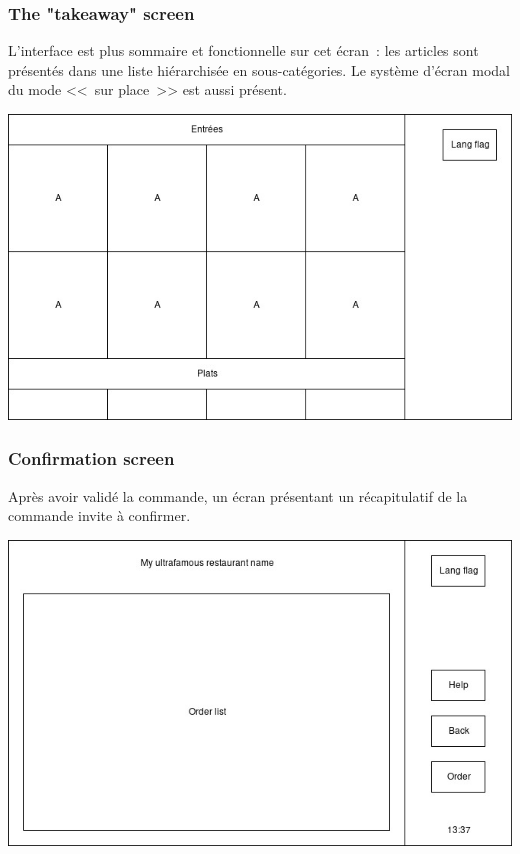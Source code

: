 \documentclass[a4paper,12pt]{article}
\begin{document}
\subsubsection{The "takeaway" screen}

L'interface est plus sommaire et fonctionnelle sur cet écran~: les articles sont présentés dans une liste hiérarchisée
en sous-catégories. Le système d'écran modal du mode <<~sur place~>> est aussi présent.

\begin{center}
	\includegraphics[width=\textwidth]{takeaway_screen.jpg}
\end{center}

\subsubsection{Confirmation screen}
Après avoir validé la commande, un écran présentant un récapitulatif de la commande invite à confirmer.

\begin{center}
	\includegraphics[width=\textwidth]{confirmation_screen.jpg}
\end{center}
\end{document}
